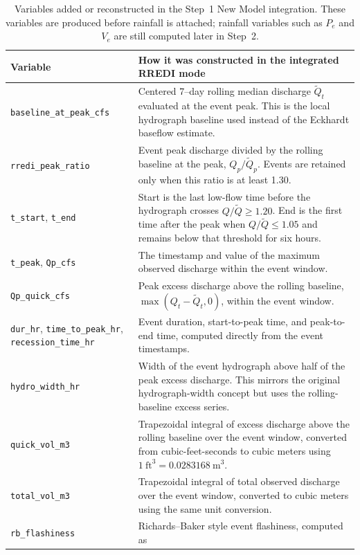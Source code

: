 \documentclass[11pt]{article}
\begin{document}
\begin{table}[htbp]\centering
\caption{Variables added or reconstructed in the Step~1 New Model integration. These
variables are produced before rainfall is attached; rainfall variables such as $P_e$ and
$V_e$ are still computed later in Step~2.}
\label{tab:rredi-vars}
\small
\begin{tabular}{p{}p{}}
\toprule
Variable & How it was constructed in the integrated RREDI mode \\
\midrule
\texttt{baseline\_at\_peak\_cfs} & Centered 7--day rolling median discharge
$\widetilde{Q}_t$ evaluated at the event peak. This is the local hydrograph baseline used
instead of the Eckhardt baseflow estimate. \\
\texttt{rredi\_peak\_ratio} & Event peak discharge divided by the rolling baseline at the
peak, $Q_p/\widetilde{Q}_{p}$. Events are retained only when this ratio is at least 1.30. \\
\texttt{t\_start}, \texttt{t\_end} & Start is the last low-flow time before the hydrograph
crosses $Q/\widetilde{Q}\ge1.20$. End is the first time after the peak when
$Q/\widetilde{Q}\le1.05$ and remains below that threshold for six hours. \\
\texttt{t\_peak}, \texttt{Qp\_cfs} & The timestamp and value of the maximum observed
discharge within the event window. \\
\texttt{Qp\_quick\_cfs} & Peak excess discharge above the rolling baseline,
$\max(Q_t-\widetilde{Q}_t,0)$, within the event window. \\
\texttt{dur\_hr}, \texttt{time\_to\_peak\_hr}, \texttt{recession\_time\_hr} & Event duration,
start-to-peak time, and peak-to-end time, computed directly from the event timestamps. \\
\texttt{hydro\_width\_hr} & Width of the event hydrograph above half of the peak excess
discharge. This mirrors the original hydrograph-width concept but uses the rolling-baseline
excess series. \\
\texttt{quick\_vol\_m3} & Trapezoidal integral of excess discharge above the rolling
baseline over the event window, converted from cubic-feet-seconds to cubic meters using
$1~\mathrm{ft}^3=0.0283168~\mathrm{m}^3$. \\
\texttt{total\_vol\_m3} & Trapezoidal integral of total observed discharge over the event
window, converted to cubic meters using the same unit conversion. \\
\texttt{rb\_flashiness} & Richards--Baker style event flashiness, computed as

\end{tabular}
\end{table}
\end{document}
